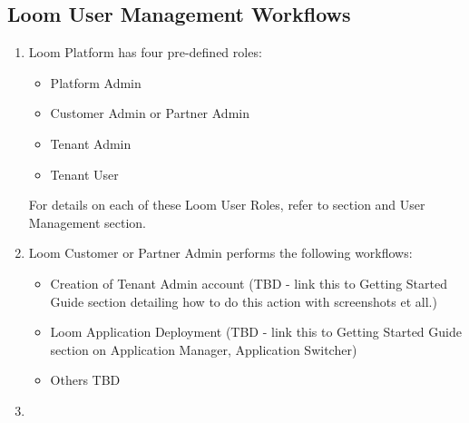 \documentclass[letterpaper,10pt,english]{sphinxmanual}
\begin{document}
\subsection{Loom User Management Workflows}
\label{\detokenize{loom_getting_started_guide:loom-user-management-workflows}}\label{\detokenize{loom_getting_started_guide:usage-wf-user-mngt}}\begin{enumerate}
\item {} 

Loom Platform has four pre-defined roles:
\begin{itemize}\setlength{\itemsep}{0pt}\setlength{\parskip}{0pt}
\item {} 
Platform Admin

\item {} 
Customer Admin or Partner Admin

\item {} 
Tenant Admin

\item {} 
Tenant User

\end{itemize}

For details on each of these Loom User Roles, refer to  section and {\hyperref[\detokenize{loom_getting_started_guide:gsg-interacting-mcdmp}]{}} User Management section.

\item {} 

Loom Customer or Partner Admin performs the following workflows:
\begin{itemize}
\item {} 
Creation of Tenant Admin account (TBD - link this to Getting Started Guide section detailing how to do this action with screenshots et all.)

\item {} 
Loom Application Deployment (TBD - link this to Getting Started Guide section on Application Manager, Application Switcher)

\item {} 
Others TBD

\end{itemize}

\item {} 


\end{enumerate}
\end{document}
